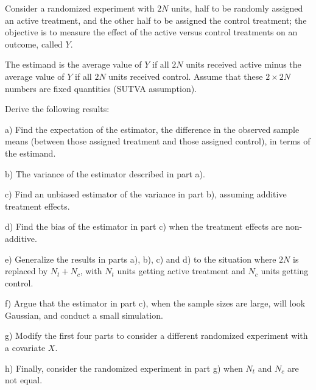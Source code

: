 \begin{exercise}\label{probability:2019:4}
Consider a randomized experiment with $2N$ units, half to be randomly assigned an active treatment, and the other half to be assigned the control treatment; the objective is to measure the effect of the active versus control treatments on an outcome, called $Y$.

The estimand is the average value of $Y$ if all $2N$ units received active minus the average value of $Y$ if all $2N$ units received control. Assume that these $2 \times 2N$ numbers are fixed quantities (SUTVA assumption).

Derive the following results:

a) Find the expectation of the estimator, the difference in the observed sample means (between those assigned treatment and those assigned control), in terms of the estimand.

b) The variance of the estimator described in part a).

c) Find an unbiased estimator of the variance in part b), assuming additive treatment effects.

d) Find the bias of the estimator in part c) when the treatment effects are non-additive.

e) Generalize the results in parts a), b), c) and d) to the situation where $2N$ is replaced by $N_t + N_c$, with $N_t$ units getting active treatment and $N_c$ units getting control.

f) Argue that the estimator in part c), when the sample sizes are large, will look Gaussian, and conduct a small simulation.

g) Modify the first four parts to consider a different randomized experiment with a covariate $X$.

h) Finally, consider the randomized experiment in part g) when $N_t$ and $N_c$ are not equal.
\end{exercise}

